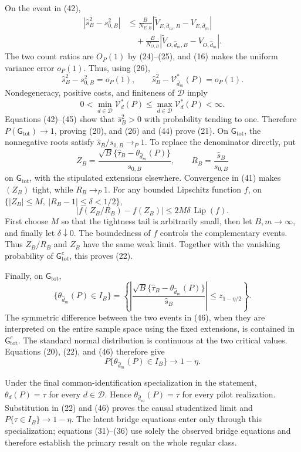 On the event in (42),
\[
\begin{aligned}
 |\widehat s_B^2-s_{0,B}^2|
 &\le\frac{B}{N_{E,B}}
 |\widetilde V_{E,\widehat d_m,B}-V_{E,\widehat d_m}|\\
 &\quad+\frac{B}{N_{O,B}}
 |\widetilde V_{O,\widehat d_m,B}-V_{O,\widehat d_m}|.
\end{aligned}                                                \tag{43}
\]
The two count ratios are \(O_P(1)\) by (24)--(25), and (16) makes the uniform variance error \(o_P(1)\).  Thus, using (26),
\[
 \widehat s_B^2-s_{0,B}^2=o_P(1),
 \qquad
 \widehat s_B^2-\mathcal V_{\widehat d_m}^*(P)=o_P(1).      \tag{44}
\]
Nondegeneracy, positive costs, and finiteness of \(\mathcal D\) imply
\[
 0<\min_{d\in\mathcal D}\mathcal V_d^*(P)
 \le\max_{d\in\mathcal D}\mathcal V_d^*(P)<\infty.        \tag{45}
\]
Equations (42)--(45) show that \(\widehat s_B^2>0\) with probability tending to one.  Therefore \(P(\mathsf G_{\mathrm{tot}})\to1\), proving (20), and (26) and (44) prove (21).  On \(\mathsf G_{\mathrm{tot}}\), the nonnegative roots satisfy \(\widehat s_B/s_{0,B}\to_P1\).  To replace the denominator directly, put
\[
 Z_B=\frac{\sqrt B\{\widehat\tau_B-\theta_{\widehat d_m}(P)\}}{s_{0,B}},
 \qquad R_B=\frac{\widehat s_B}{s_{0,B}}
\]
on \(\mathsf G_{\mathrm{tot}}\), with the stipulated extensions elsewhere.  Convergence in (41) makes \((Z_B)\) tight, while \(R_B\to_P1\).  For any bounded Lipschitz function \(f\), on \(\{|Z_B|\le M,\ |R_B-1|\le\delta<1/2\}\),
\[
 |f(Z_B/R_B)-f(Z_B)|\le 2M\delta\,\operatorname{Lip}(f).
\]
First choose \(M\) so that the tightness tail is arbitrarily small, then let \(B,m\to\infty\), and finally let \(\delta\downarrow0\).  The boundedness of \(f\) controls the complementary events.  Thus \(Z_B/R_B\) and \(Z_B\) have the same weak limit.  Together with the vanishing probability of \(\mathsf G_{\mathrm{tot}}^c\), this proves (22).

Finally, on \(\mathsf G_{\mathrm{tot}}\),
\[
 \{\theta_{\widehat d_m}(P)\in I_B\}
 =\left\{\left|
 \frac{\sqrt B\{\widehat\tau_B-\theta_{\widehat d_m}(P)\}}{\widehat s_B}
 \right|\le z_{1-\eta/2}\right\}.                          \tag{46}
\]
The symmetric difference between the two events in (46), when they are interpreted on the entire sample space using the fixed extensions, is contained in \(\mathsf G_{\mathrm{tot}}^c\).  The standard normal distribution is continuous at the two critical values.  Equations (20), (22), and (46) therefore give
\[
 P\{\theta_{\widehat d_m}(P)\in I_B\}\longrightarrow1-\eta.
\]

Under the final common-identification specialization in the statement, \(\theta_d(P)=\tau\) for every \(d\in\mathcal D\).  Hence \(\theta_{\widehat d_m}(P)=\tau\) for every pilot realization.  Substitution in (22) and (46) proves the causal studentized limit and \(P\{\tau\in I_B\}\to1-\eta\).  The latent bridge equations enter only through this specialization; equations (31)--(36) use solely the observed bridge equations and therefore establish the primary result on the whole regular class.
